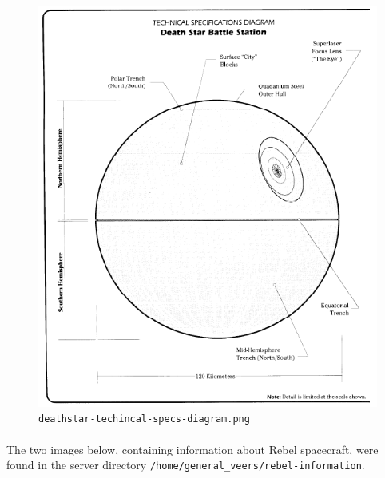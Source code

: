 \documentclass{article}
\begin{document}
\begin{figure}[H]
	\includegraphics[width=\linewidth]{resources/plans/deathstar-technical-specs-diagram.png}
	\caption{\texttt{deathstar-techincal-specs-diagram.png}}
	\label{fig:deathstar_technical_specs_diagram}
\end{figure}

\paragraph{}
The two images below, containing information about Rebel spacecraft, were found in the server directory \texttt{/home/general\_veers/rebel-information}.
\end{document}

